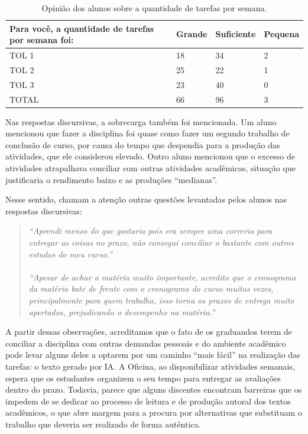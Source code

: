 \documentclass[portuguese]{textolivre}
\begin{document}
\begin{table}[h!]
\centering
\begin{threeparttable}
\caption{Opinião dos alunos sobre a quantidade de tarefas por semana.}\label{tab-6}
\begin{tabular}{llll}
\toprule
Para você, a quantidade de tarefas por semana foi: & Grande & Suficiente & Pequena \\
\midrule
TOL 1 & 18 & 34 & 2 \\
TOL 2 & 25 & 22 & 1 \\
TOL 3 & 23 & 40 & 0 \\
TOTAL & 66 & 96 & 3 \\
\bottomrule
\end{tabular}
\end{threeparttable}
\end{table}

Nas respostas discursivas, a sobrecarga também foi mencionada. Um aluno mencionou que fazer a disciplina foi quase como fazer um segundo trabalho de conclusão de curso, por causa do tempo que despendia para a produção das atividades, que ele considerou elevado. Outro aluno mencionou que o excesso de atividades atrapalhava conciliar com outras atividades acadêmicas, situação que justificaria o rendimento baixo e as produções ``medianas''.

Nesse sentido, chamam a atenção outras questões levantadas pelos alunos nas respostas discursivas:

\begin{quote}
\textit{``Aprendi menos do que gostaria pois era sempre uma correria para entregar as coisas no prazo, não consegui conciliar o bastante com outros estudos do meu curso.''
\\
\\
``Apesar de achar a matéria muito importante, acredito que o cronograma da matéria bate de frente com o cronograma do curso muitas vezes, principalmente para quem trabalha, isso torna os prazos de entrega muito apertados, prejudicando o desempenho na matéria.''}
\end{quote}

A partir dessas observações, acreditamos que o fato de os graduandos terem de conciliar a disciplina com outras demandas pessoais e do ambiente acadêmico pode levar alguns deles a optarem por um caminho ``mais fácil'' na realização das tarefas: o texto gerado por IA. A Oficina, ao disponibilizar atividades semanais, espera que os estudantes organizem o seu tempo para entregar as avaliações dentro do prazo. Todavia, parece que alguns discentes encontram barreiras que os impedem de se dedicar ao processo de leitura e de produção autoral dos textos acadêmicos, o que abre margem para a procura por alternativas que substituam o trabalho que deveria ser realizado de forma autêntica.
\end{document}
